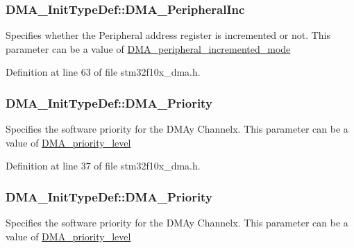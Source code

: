 \subsubsection[{\texorpdfstring{D\+M\+A\+\_\+\+Peripheral\+Inc}{DMA_PeripheralInc}}]{ D\+M\+A\+\_\+\+Init\+Type\+Def\+::\+D\+M\+A\+\_\+\+Peripheral\+Inc}\hypertarget{struct_d_m_a___init_type_def_ad4d427790f9a089ca0257a358fc263c2}{}\label{struct_d_m_a___init_type_def_ad4d427790f9a089ca0257a358fc263c2}
Specifies whether the Peripheral address register is incremented or not. This parameter can be a value of \hyperlink{group___d_m_a__peripheral__incremented__mode}{D\+M\+A\+\_\+peripheral\+\_\+incremented\+\_\+mode} 

Definition at line 63 of file stm32f10x\+\_\+dma.\+h.

\subsubsection[{\texorpdfstring{D\+M\+A\+\_\+\+Priority}{DMA_Priority}}]{ D\+M\+A\+\_\+\+Init\+Type\+Def\+::\+D\+M\+A\+\_\+\+Priority}\hypertarget{struct_d_m_a___init_type_def_a79b5663e6dd33a46a7662e97b0b01f5d}{}\label{struct_d_m_a___init_type_def_a79b5663e6dd33a46a7662e97b0b01f5d}
Specifies the software priority for the D\+M\+Ay Channelx. This parameter can be a value of \hyperlink{group___d_m_a__priority__level}{D\+M\+A\+\_\+priority\+\_\+level} 

Definition at line 37 of file stm32f10x\+\_\+dma.\+h.

\subsubsection[{\texorpdfstring{D\+M\+A\+\_\+\+Priority}{DMA_Priority}}]{ D\+M\+A\+\_\+\+Init\+Type\+Def\+::\+D\+M\+A\+\_\+\+Priority}\hypertarget{struct_d_m_a___init_type_def_ab9a17bd51778478cbd728c868206dca0}{}\label{struct_d_m_a___init_type_def_ab9a17bd51778478cbd728c868206dca0}
Specifies the software priority for the D\+M\+Ay Channelx. This parameter can be a value of \hyperlink{group___d_m_a__priority__level}{D\+M\+A\+\_\+priority\+\_\+level} 

